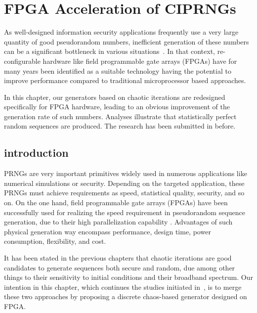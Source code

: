\chapter{FPGA Acceleration of CIPRNGs}
\label{FPGA Acceleration of CIPRNGs}

As well-designed information security 
applications frequently use a very large quantity of good 
pseudorandom numbers, inefficient generation of 
these numbers can be a significant bottleneck 
in various situations~\cite{Porter198443,Batina20031,Carroll1990613,Liu2012331}. 
In that context, re-configurable hardware like field programmable gate arrays (FPGAs)
 have for many years been identified as a suitable technology having the potential to improve performance compared to traditional microprocessor based approaches. 

In this chapter, %
our generators based on chaotic 
iterations are redesigned specifically for FPGA hardware, 
leading to an obvious improvement of the 
generation rate of such numbers. Analyses illustrate that 
statistically perfect random sequences 
are produced.
The research has been submitted in \cite{submit1, submit3} before.

\section{introduction}
PRNGs are very important primitives widely used 
in numerous applications like numerical simulations or security.
Depending on the targeted application, these PRNGs must achieve requirements
as speed, statistical quality, security, and so on. 
On the one hand, field programmable gate arrays (FPGAs) have been successfully used for realizing 
the speed requirement in pseudorandom sequence generation, due to their high parallelization capability \cite{Bojani200663, Danger:2009:HST:1645457.1645933, Tsoi:2003:CFT:938383.938400}. Advantages of such physical generation way encompass performance, design time, power consumption, flexibility, and cost.


It has been stated in the previous chapters that chaotic iterations are
good candidates to generate  sequences both secure and random,
due among other things to
their sensitivity to initial conditions and their broadband spectrum. 
Our intention in this chapter, which continues the studies initiated 
in~\cite{DBLP:journals/corr/abs-1112-5239}, is to merge these two approaches by
proposing a discrete chaos-based generator
designed on FPGA.

